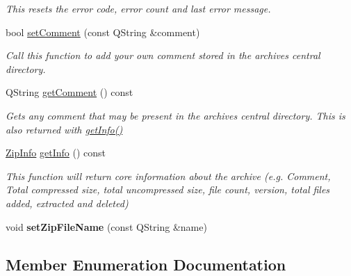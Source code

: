 \begin{DoxyCompactItemize}
\begin{DoxyCompactList}\small\item\em This resets the error code, error count and last error message. \end{DoxyCompactList}\item 
bool \hyperlink{class_ab_zip_a6eafaf85de8379cbbf0e0936ff35f82b}{set\+Comment} (const Q\+String \&comment)
\begin{DoxyCompactList}\small\item\em Call this function to add your own comment stored in the archives central directory. \end{DoxyCompactList}\item 
Q\+String \hyperlink{class_ab_zip_a03bf0363847fa7d2b37ca9217d497b73}{get\+Comment} () const 
\begin{DoxyCompactList}\small\item\em Gets any comment that may be present in the archives central directory. This is also returned with \hyperlink{class_ab_zip_a1516ad117dad8e91491a6a5367539f70}{get\+Info()} \end{DoxyCompactList}\item 
\hyperlink{class_zip_info}{Zip\+Info} \hyperlink{class_ab_zip_a1516ad117dad8e91491a6a5367539f70}{get\+Info} () const 
\begin{DoxyCompactList}\small\item\em This function will return core information about the archive (e.\+g. Comment, Total compressed size, total uncompressed size, file count, version, total files added, extracted and deleted) \end{DoxyCompactList}\item 
void {\bfseries set\+Zip\+File\+Name} (const Q\+String \&name)\hypertarget{class_ab_zip_a769a83363d37087880fb9b60a1f32fc4}{}\label{class_ab_zip_a769a83363d37087880fb9b60a1f32fc4}

\end{DoxyCompactItemize}


\subsection{Member Enumeration Documentation}
